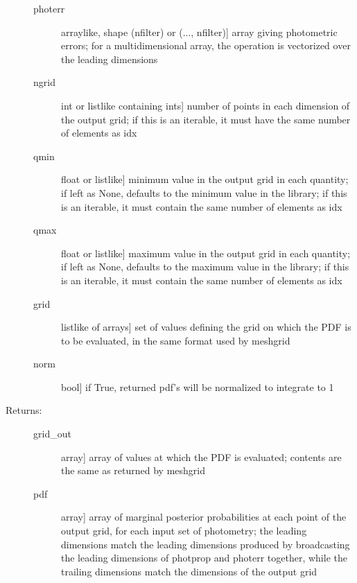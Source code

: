 \documentclass[letterpaper,10pt,english]{sphinxmanual}
\begin{document}
\begin{fulllineitems}
\begin{fulllineitems}
\begin{description}
\begin{description}
\item[{photerr}] \leavevmode{[}arraylike, shape (nfilter) or (..., nfilter){]}
array giving photometric errors; for a multidimensional
array, the operation is vectorized over the leading
dimensions

\item[{ngrid}] \leavevmode{[}int or listlike containing ints{]}
number of points in each dimension of the output grid;
if this is an iterable, it must have the same number of
elements as idx

\item[{qmin}] \leavevmode{[}float or listlike{]}
minimum value in the output grid in each quantity; if
left as None, defaults to the minimum value in the
library; if this is an iterable, it must contain the
same number of elements as idx

\item[{qmax}] \leavevmode{[}float or listlike{]}
maximum value in the output grid in each quantity; if
left as None, defaults to the maximum value in the
library; if this is an iterable, it must contain the
same number of elements as idx

\item[{grid}] \leavevmode{[}listlike of arrays{]}
set of values defining the grid on which the PDF is to
be evaluated, in the same format used by meshgrid

\item[{norm}] \leavevmode{[}bool{]}
if True, returned pdf's will be normalized to integrate
to 1

\end{description}

\item[{Returns:}] \leavevmode\begin{description}
\item[{grid\_out}] \leavevmode{[}array{]}
array of values at which the PDF is evaluated; contents
are the same as returned by meshgrid

\item[{pdf}] \leavevmode{[}array{]}
array of marginal posterior probabilities at each point
of the output grid, for each input set of photometry; the leading
dimensions match the leading dimensions produced by
broadcasting the leading dimensions of photprop and
photerr together, while the trailing dimensions match
the dimensions of the output grid

\end{description}

\end{description}


\end{fulllineitems}
\end{fulllineitems}
\end{document}
